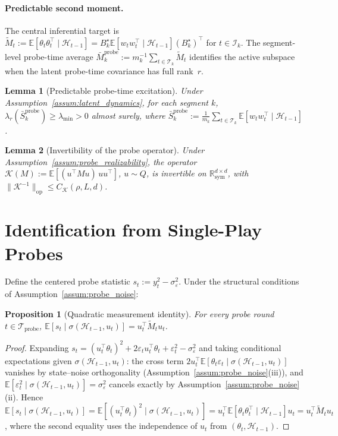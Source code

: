 \documentclass{article}
\newcommand{\R}{\mathbb{R}}
\newcommand{\E}{\mathbb{E}}
\newcommand{\op}{\mathrm{op}}
\newcommand{\cH}{\mathcal{H}}
\newcommand{\cT}{\mathcal{T}}
\newcommand{\cI}{\mathcal{I}}
\newcommand{\cTprobe}{\mathcal{T}_{\mathrm{probe}}}
\newtheorem{lemma}{Lemma}
\newtheorem{proposition}{Proposition}
\begin{document}
\paragraph{Predictable second moment.}
The central inferential target is $\widetilde{M}_t := \E[\theta_t \theta_t^\top \mid \cH_{t-1}] = B_k^\star \E[w_t w_t^\top \mid \cH_{t-1}] (B_k^\star)^\top$ for $t \in \cI_k$.
The segment-level probe-time average $\bar{M}_k^{\mathrm{probe}} := m_k^{-1} \sum_{t \in \cT_k} \widetilde{M}_t$ identifies the active subspace when the latent probe-time covariance has full rank~$r$.

\begin{lemma}[Predictable probe-time excitation]
\label{lem:probe_excitation}
Under Assumption~\ref{assum:latent_dynamics}, for each segment $k$,
$\lambda_r(\bar S_k^{\mathrm{probe}})\ge \lambda_{\min} > 0$ almost surely,
where $\bar S_k^{\mathrm{probe}} := \frac{1}{m_k}\sum_{t\in \cT_k}\E[w_t w_t^\top \mid \cH_{t-1}]$.
\end{lemma}

\begin{lemma}[Invertibility of the probe operator]
\label{lem:K_invertible}
Under Assumption~\ref{assum:probe_realizability}, the operator
$\mathcal K(M):=\E[(u^\top M u)\,uu^\top]$, $u\sim Q$,
is invertible on $\R_{\mathrm{sym}}^{d\times d}$, with $\|\mathcal K^{-1}\|_{\op} \le C_{\mathcal K}(\rho, L, d)$.
\end{lemma}

\section{Identification from Single-Play Probes}
\label{sec:identification}

Define the centered probe statistic $s_t := y_t^2 - \sigma_\varepsilon^2$.
Under the structural conditions of Assumption~\ref{assum:probe_noise}:

\begin{proposition}[Quadratic measurement identity]
  \label{prop:quad}
  For every probe round $t \in \cTprobe$,
  $\E[s_t \mid \sigma(\cH_{t-1}, u_t)] = u_t^\top \widetilde{M}_t u_t$.
\end{proposition}

\begin{proof}
Expanding $s_t = (u_t^\top \theta_t)^2 + 2\varepsilon_t u_t^\top \theta_t + \varepsilon_t^2 - \sigma_\varepsilon^2$ and taking conditional expectations given $\sigma(\cH_{t-1},u_t)$:
the cross term $2u_t^\top \E[\theta_t\varepsilon_t \mid \sigma(\cH_{t-1},u_t)]$ vanishes by state--noise orthogonality (Assumption~\ref{assum:probe_noise}(iii)), and $\E[\varepsilon_t^2 \mid \sigma(\cH_{t-1},u_t)] = \sigma_\varepsilon^2$ cancels exactly by Assumption~\ref{assum:probe_noise}(ii).
Hence $\E[s_t \mid \sigma(\cH_{t-1},u_t)] = \E[(u_t^\top \theta_t)^2 \mid \sigma(\cH_{t-1},u_t)] = u_t^\top \E[\theta_t\theta_t^\top \mid \cH_{t-1}] u_t = u_t^\top \widetilde M_t u_t$,
where the second equality uses the independence of $u_t$ from $(\theta_t, \cH_{t-1})$.
\end{proof}
\end{document}
